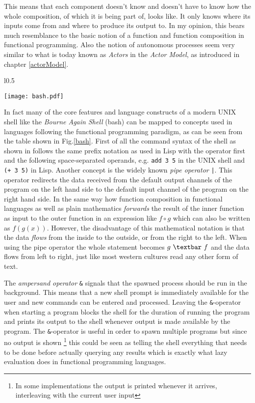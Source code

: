 This means that each component doesn't know and doesn't have to know
how the whole composition, of which it is being part of, looks like.
It only knows where its inputs come from and where to produce its
output to. In my opinion, this bears much resemblance to the basic
notion of a function and function composition in functional programming.
Also the notion of autonomous processes seem very similar to what
is today known as \textit{Actors} in the \textit{Actor Model},
as introduced in chapter \ref{actorModel}.

\begin{wrapfigure}{l}{0.5\textwidth}

  \texttt{[image: bash.pdf]}
  \caption{Mapping of concepts from the original UNIX shell to
          functional programming concepts.}
  \label{bash}
  \vspace{-100pt}

\end{wrapfigure}

In fact many of the core features and language constructs of a modern
UNIX shell like the \textit{Bourne Again Shell} (bash) \cite{bash}
can be mapped to concepts used in languages following the
functional programming paradigm, as can be seen from the table
shown in Fig.\ref{bash}. First of all the command syntax of the
shell as shown in \cite{unix78} follows the same prefix notation
as used in Lisp \cite{lisp86} with the operator first and the following
space-separated operands, e.g. \texttt{add 3 5} in the UNIX
shell and \texttt{(+ 3 5)} in Lisp.
Another concept is the widely known \textit{pipe operator} \texttt{|}.
This operator redirects the data received from the default output
channels of the program on the left hand side to the default input
channel of the program on the right hand side. In the same way how
function composition in functional languages as well as plain mathematics
\textit{forwards} the result of the inner function as input to the outer
function in an expression like $f \circ g$ which can also be written as
$f(g(x))$. However, the disadvantage of this mathematical notation
is that the data \textit{flows} from the inside to the outside, or
from the right to the left. When using the pipe operator the whole
statement becomes $g\ \textbar \ f$ and the data flows from left to right,
just like most western cultures read any other form of text.

The \textit{ampersand operator} \texttt{\&} signals that the spawned process
should be run in the background. This means that a new shell
prompt is immediately available for the user and new commands can be
entered and processed. Leaving the \texttt{\&}-operator when starting a program
blocks the shell for the duration of running the program and prints its
output to the shell whenever output is made available by the program.
The \texttt{\&}-operator is useful in order to spawn multiple programs but
since no output is shown \footnote{In some implementations the output
is printed whenever it arrives, interleaving with the current user
input} this could be seen as telling the shell
everything that needs to be done before actually querying any results
which is exactly what lazy evaluation does in functional programming
languages.

